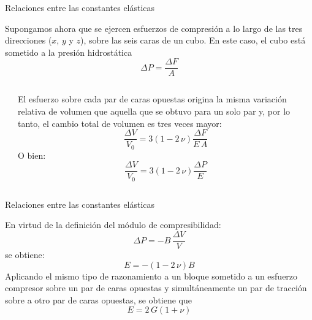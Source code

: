 \documentclass[11pt,handout,aspectratio=1610]{beamer}
\begin{document}
\begin{frame}{Relaciones entre las constantes elásticas}

    Supongamos ahora que se ejercen esfuerzos de compresión a lo largo de las tres direcciones ($x$, $y$ y $z$), sobre las seis caras de un cubo. En este caso, el cubo está sometido a la presión hidrostática $$\Delta P = \frac{\Delta F}{A}$$
    
    \begin{columns}
        \begin{column}{0.3\textwidth}
        \end{column}
        \begin{column}{0.7\textwidth}
            El esfuerzo sobre cada par de caras opuestas origina la misma variación relativa de volumen que aquella que se obtuvo para un solo par y, por lo tanto, el cambio total de volumen es tres veces mayor: $$ \frac{\Delta V}{V_0} = 3 \left(1 - 2 \, \nu\right) \frac{\Delta F}{E \, A} $$ O bien: $$ \frac{\Delta V}{V_0} = 3 \left(1 - 2 \, \nu\right) \frac{\Delta P}{E} $$
        \end{column}
    \end{columns}
    
\end{frame}

\begin{frame}{Relaciones entre las constantes elásticas}

    En virtud de la definición del módulo de compresibilidad: $$ \Delta P = - B \, \frac{\Delta V}{V} $$ se obtiene: $$ E = - \left(1-2\, \nu\right) B $$ Aplicando el mismo tipo de razonamiento a un bloque sometido a un esfuerzo compresor sobre un par de caras opuestas y simultáneamente un par de tracción sobre a otro par de caras opuestas, se obtiene que $$ E = 2 \, G \left(1 + \nu\right) $$

\end{frame}
\end{document}

